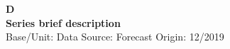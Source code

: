 \documentclass[a4paper,12pt]{article}
\begin{document}
\thispagestyle{empty}
\begin{landscape}
\begin{center}

\textbf{D} \\ 

\textbf{Series brief description} \\ 

Base/Unit: 
\space \space \space Data Source:  
\space \space \space Forecast Origin: 12/2019 \\ 
\end{center}

\begin{small}   \end{small} 

\end{landscape}
\end{document}
